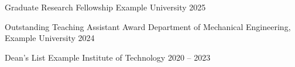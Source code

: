 
\VectraAwardEntry
    {Graduate Research Fellowship}
    {Example University}
    {2025}

\VectraAwardEntry
    {Outstanding Teaching Assistant Award}
    {Department of Mechanical Engineering, Example University}
    {2024}

\VectraAwardEntry
    {Dean's List}
    {Example Institute of Technology}
    {2020 -- 2023}